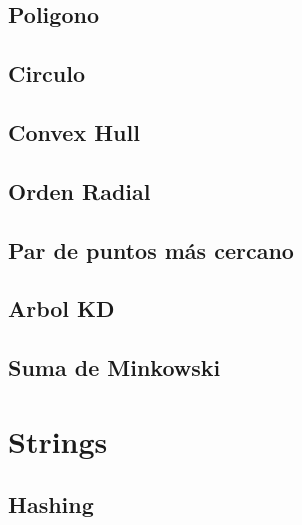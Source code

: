\documentclass[a4paper,11pt,landscape,twocolumn]{article}
\begin{document}


\subsection{Poligono}



\subsection{Circulo}



\subsection{Convex Hull}



\subsection{Orden Radial}



\subsection{Par de puntos más cercano}



\subsection{Arbol KD}



\subsection{Suma de Minkowski}



\section{Strings}

\subsection{Hashing}
\end{document}
